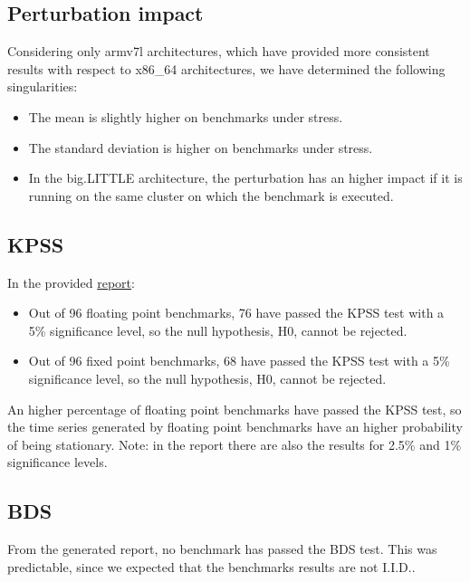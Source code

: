 \subsection{Perturbation impact}
Considering only armv7l architectures, which have provided more consistent results with respect to x86\_64 architectures, we have determined the following singularities:
\begin{itemize}
	\item The mean is slightly higher on benchmarks under stress.
	\item The standard deviation is higher on benchmarks under stress.
	\item In the big.LITTLE architecture, the perturbation has an higher impact if it is running on the same cluster on which the benchmark is executed.
\end{itemize}

\subsection{KPSS}
In the provided \href{../statistics/tests\_results.txt}{report}:
\begin{itemize}
	\item Out of 96 floating point benchmarks, 76 have passed the KPSS test with a 5\% significance level, so the null hypothesis, H0, cannot be rejected.
	\item Out of 96 fixed point benchmarks, 68 have passed the KPSS test with a 5\% significance level, so the null hypothesis, H0, cannot be rejected.
\end{itemize}
An higher percentage of floating point benchmarks have passed the KPSS test, so the time series generated by floating point benchmarks have an higher probability of being stationary.\newline
Note: in the report there are also the results for 2.5\% and 1\% significance levels.

\subsection{BDS}
From the generated report, no benchmark has passed the BDS test. This was predictable, since we expected that the benchmarks results are not I.I.D..

